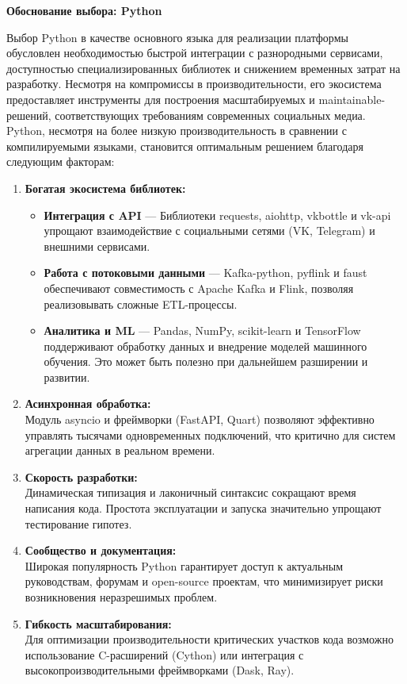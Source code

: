             \textbf{Обоснование выбора: Python} 

            Выбор Python в качестве основного языка для реализации платформы обусловлен необходимостью быстрой интеграции с разнородными сервисами, доступностью специализированных библиотек и снижением временных затрат на разработку. Несмотря на компромиссы в производительности, его экосистема предоставляет инструменты для построения масштабируемых и maintainable-решений, соответствующих требованиям современных социальных медиа. \\

            Python, несмотря на более низкую производительность в сравнении с компилируемыми языками, становится оптимальным решением благодаря следующим факторам:
            \begin{enumerate}
                \item \textbf{Богатая экосистема библиотек:}
                \begin{itemize}
                    \item \textbf{Интеграция с API} — Библиотеки requests, aiohttp, vkbottle и vk-api упрощают взаимодействие с социальными сетями (VK, Telegram) и внешними сервисами.
                    \item \textbf{Работа с потоковыми данными} — Kafka-python, pyflink и faust обеспечивают совместимость с Apache Kafka и Flink, позволяя реализовывать сложные ETL-процессы.
                    \item \textbf{Аналитика и ML} — Pandas, NumPy, scikit-learn и TensorFlow поддерживают обработку данных и внедрение моделей машинного обучения. Это может быть полезно при дальнейшем разширении и развитии.
                \end{itemize}

                \item \textbf{Асинхронная обработка:} \\
                Модуль asyncio и фреймворки (FastAPI, Quart) позволяют эффективно управлять тысячами одновременных подключений, что критично для систем агрегации данных в реальном времени.

                \item \textbf{Скорость разработки:} \\
                Динамическая типизация и лаконичный синтаксис сокращают время написания кода. Простота эксплуатации и запуска значительно упрощают тестирование гипотез.

                \item \textbf{Сообщество и документация:} \\
                Широкая популярность Python гарантирует доступ к актуальным руководствам, форумам и open-source проектам, что минимизирует риски возникновения неразрешимых проблем.

                \item \textbf{Гибкость масштабирования:} \\
                Для оптимизации производительности критических участков кода возможно использование C-расширений (Cython) или интеграция с высокопроизводительными фреймворками (Dask, Ray).
            \end{enumerate}

